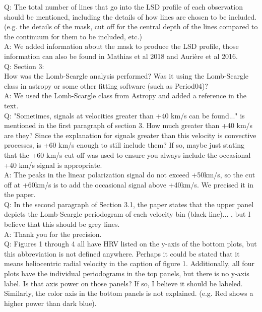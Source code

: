 \documentclass{article}
\begin{document}
Q: The total number of lines that go into the LSD profile of each observation should be mentioned,
including the details of how lines are chosen to be included. (e.g. the details of the mask, cut off
for the central depth of the lines compared to the continuum for them to be included, etc.)\\

A: We added information about the mask to produce the LSD profile, those information can also be found in Mathias et al 2018 and Aurière et al 2016.\\

Q: Section 3:\\
How was the Lomb-Scargle analysis performed? Was it using the Lomb-Scargle class in astropy
or some other fitting software (such as Period04)?\\

A: We used the Lomb-Scargle class from Astropy and added a reference in the text.\\ 

Q: "Sometimes, signals at velocities greater than +40 km/s can be found..." is mentioned in the first paragraph of section 3. How much greater than +40 km/s are they? Since the explanation for
signals greater than this velocity is convective processes, is +60 km/s enough to still include
them? If so, maybe just stating that the +60 km/s cut off was used to ensure you always include
the occasional +40 km/s signal is appropriate.\\

A: The peaks in the linear polarization signal do not exceed +50km/s, so the cut off at +60km/s is to add the occasional signal above +40km/s. We precised it in the paper. \\

Q: In the second paragraph of Section 3.1, the paper states that the upper panel depicts the
Lomb-Scargle periodogram of each velocity bin (black line)... , but I believe that this should be
grey lines.\\

A: Thank you for the precision. \\

Q: Figures 1 through 4 all have HRV listed on the y-axis of the bottom plots, but this abbreviation is not defined anywhere. Perhaps it could be stated that it means heliocentric radial velocity in the
caption of figure 1. Additionally, all four plots have the individual periodograms in the top panels,
but there is no y-axis label. Is that axis power on those panels? If so, I believe it should be labeled. Similarly, the color axis in the bottom panels is not explained. (e.g. Red shows a higher power than dark blue).\\
\end{document}
